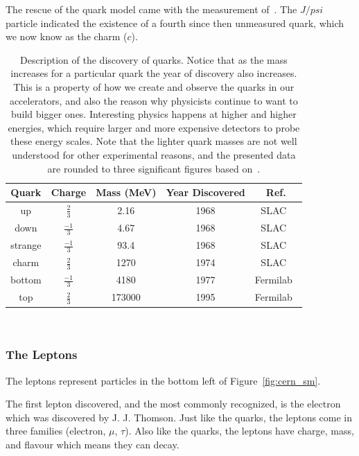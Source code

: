 The rescue of the quark model came with the measurement of~\citep{Jpsi_PhysRevLett.33.1404}.
The $J/psi$ particle indicated the existence of a fourth since then unmeasured quark, which we now know as the charm ($c$).

\begin{table}
\begin{center}
\begin{tabular}{||c c c c c||}
 \hline
 Quark & Charge & Mass (MeV) & Year Discovered & Ref.\\ [0.5ex]
 \hline\hline
 up & $\frac{2}{3}$ & 2.16 & 1968 & SLAC~\citep{1969PhRvL..23..930B, 1969PhRvL..23..935B} \\
 \hline
 down & $\frac{-1}{3}$ & 4.67 & 1968 & SLAC~\citep{1969PhRvL..23..930B, 1969PhRvL..23..935B} \\
 \hline
 strange & $\frac{-1}{3}$ & 93.4 & 1968 & SLAC~\citep{1969PhRvL..23..930B, 1969PhRvL..23..935B} \\
 \hline
 charm & $\frac{2}{3}$ & 1270 & 1974 & SLAC~\citep{Jpsi_PhysRevLett.33.1404} \\
 \hline
 bottom & $\frac{-1}{3}$ & 4180 & 1977 & Fermilab~\citep{bottom_PhysRevLett.39.252}\\
 \hline
 top & $\frac{2}{3}$ & 173000 & 1995 & Fermilab~\citep{topquark_Abachi_1995} \\
 \hline
\end{tabular}
\caption{Description of the discovery of quarks. Notice that as the mass increases for a particular quark the year of discovery also increases. This is a property of how we create and observe the quarks in our accelerators, and also the reason why physicists continue to want to build bigger ones. Interesting physics happens at higher and higher energies, which require larger and more expensive detectors to probe these energy scales. Note that the lighter quark masses are not well understood for other experimental reasons, and the presented data are rounded to three significant figures based on~\citep{Workman:2022ynf}.}
\end{center}
\end{table}
~\label{table:quark}

\subsubsection{The Leptons}

The leptons represent particles in the bottom left of Figure~\ref{fig:cern_sm}.

The first lepton discovered, and the most commonly recognized, is the electron which was discovered by J. J. Thomson.
Just like the quarks, the leptons come in three families (electron, $\mu$, $\tau$).
Also like the quarks, the leptons have charge, mass, and flavour which means they can decay.

